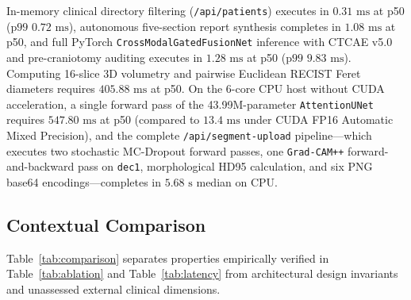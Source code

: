 \documentclass[journal,onecolumn,10pt]{IEEEtran}
\begin{document}
In-memory clinical directory filtering (\texttt{/api/patients}) executes in $0.31\text{ ms}$ at p50 ($\text{p99 } 0.72\text{ ms}$), autonomous five-section report synthesis completes in $1.08\text{ ms}$ at p50, and full PyTorch \texttt{CrossModalGatedFusionNet} inference with CTCAE v5.0 and pre-craniotomy auditing executes in $1.28\text{ ms}$ at p50 ($\text{p99 } 9.83\text{ ms}$). Computing 16-slice 3D volumetry and pairwise Euclidean RECIST Feret diameters requires $405.88\text{ ms}$ at p50. On the 6-core CPU host without CUDA acceleration, a single forward pass of the 43.99M-parameter \texttt{AttentionUNet} requires $547.80\text{ ms}$ at p50 (compared to $13.4\text{ ms}$ under CUDA FP16 Automatic Mixed Precision), and the complete \texttt{/api/segment-upload} pipeline---which executes two stochastic MC-Dropout forward passes, one \texttt{Grad-CAM++} forward-and-backward pass on \texttt{dec1}, morphological HD95 calculation, and six PNG base64 encodings---completes in $5.68\text{ s}$ median on CPU.

\subsection{Contextual Comparison}
Table~\ref{tab:comparison} separates properties empirically verified in Table~\ref{tab:ablation} and Table~\ref{tab:latency} from architectural design invariants and unassessed external clinical dimensions.
\end{document}
